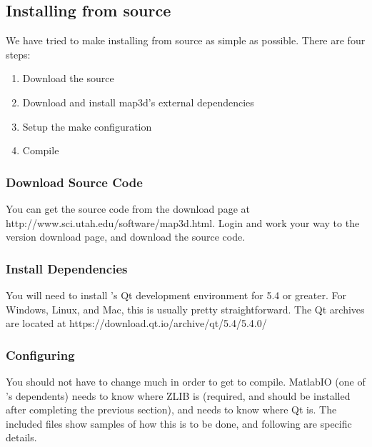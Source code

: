 \subsection{Installing from source}
\label{sec:source-install}

We have tried to make installing \map{} from source as simple as possible.  
There are four steps:


\begin{enumerate}
  \item Download the source
  \item Download and install map3d's external dependencies
  \item Setup the make configuration
  \item Compile
\end{enumerate}

\subsubsection{Download Source Code}
You can get the \map{} source code from the \map{} download page at 
{http://www.sci.utah.edu/software/map3d.html}.  Login and work your way
to the \map{} version \version{} download page, and download 
the source code.

\subsubsection{Install Dependencies}
You will need to install \map{}'s Qt development environment for 5.4 or greater.
For Windows, Linux, and Mac, this is usually pretty straightforward.  The Qt archives
are located at  {https://download.qt.io/archive/qt/5.4/5.4.0/}

\subsubsection{Configuring \map{}}
You should not have to change much in order to get \map{} to compile.
MatlabIO (one of \map{}'s dependents) needs to know where ZLIB is
(required, and should be installed after completing the previous section),
and \map{} needs to know where Qt is.  The included files show samples of
how this is to be done, and following are specific details.

